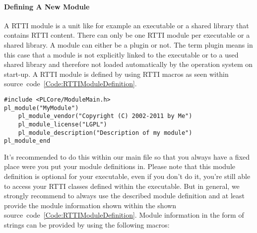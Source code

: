 \paragraph{Defining A New Module}
A RTTI module is a unit like for example an executable or a shared library that contains RTTI content. There can only be one RTTI module per executable or a shared library. A module can either be a plugin or not. The term plugin means in this case that a module is not explicitly linked to the executable or to a used shared library and therefore not loaded automatically by the operation system on start-up. A RTTI module is defined by using RTTI macros as seen within source~code~\ref{Code:RTTIModuleDefinition}.
\begin{lstlisting}[float=htb,label=Code:RTTIModuleDefinition,caption={Defining a new RTTI module}]
#include <PLCore/ModuleMain.h>
pl_module("MyModule")
	pl_module_vendor("Copyright (C) 2002-2011 by Me")
	pl_module_license("LGPL")
	pl_module_description("Description of my module")
pl_module_end
\end{lstlisting}
It's recommended to do this within our main file so that you always have a fixed place were you put your module definitions in. Please note that this module definition is optional for your executable, even if you don't do it, you're still able to access your RTTI classes defined within the executable. But in general, we strongly recommend to always use the described module definition and at least provide the module information shown within the shown source~code~\ref{Code:RTTIModuleDefinition}. Module information in the form of strings can be provided by using the following macros:
